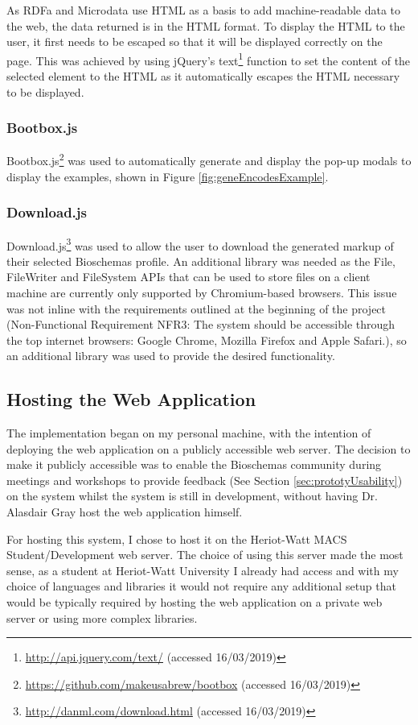 As RDFa and Microdata use HTML as a basis to add machine-readable data to the web, the data returned is in the HTML format. To display the HTML to the user, it first needs to be escaped so that it will be displayed correctly on the page. This was achieved by using jQuery's text\footnote{\url{http://api.jquery.com/text/} (accessed 16/03/2019)} function to set the content of the selected element to the HTML as it automatically escapes the HTML necessary to be displayed.

\subsubsection{Bootbox.js}
Bootbox.js\footnote{\url{https://github.com/makeusabrew/bootbox} (accessed 16/03/2019)} was used to automatically generate and display the pop-up modals to display the examples, shown in Figure \ref{fig:geneEncodesExample}. 

\subsubsection{Download.js}
Download.js\footnote{\url{http://danml.com/download.html} (accessed 16/03/2019)} was used to allow the user to download the generated markup of their selected Bioschemas profile. An additional library was needed as the File, FileWriter and FileSystem APIs that can be used to store files on a client machine are currently only supported by Chromium-based browsers. This issue was not inline with the requirements outlined at the beginning of the project (Non-Functional Requirement NFR3: The system should be accessible through the top internet browsers: Google Chrome, Mozilla Firefox and Apple Safari.), so an additional library was used to provide the desired functionality.

\subsection{Hosting the Web Application}
The implementation began on my personal machine, with the intention of deploying the web application on a publicly accessible web server. The decision to make it publicly accessible was to enable the Bioschemas community during meetings and workshops to provide feedback (See Section \ref{sec:prototyUsability}) on the system whilst the system is still in development, without having Dr. Alasdair Gray host the web application himself.

For hosting this system, I chose to host it on the Heriot-Watt MACS Student/Development web server. The choice of using this server made the most sense, as a student at Heriot-Watt University I already had access and with my choice of languages and libraries it would not require any additional setup that would be typically required by hosting the web application on a private web server or using more complex libraries.


